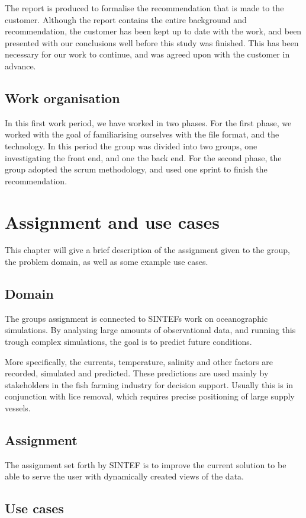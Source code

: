 \documentclass[11pt,a4paper,titlepage,oneside]{report}
\begin{document}
The report is produced to formalise the recommendation that is made to the customer. Although the report contains the entire background and recommendation, the customer has been kept up to date with the work, and been presented with our conclusions well before this study was finished. This has been necessary for our work to continue, and was agreed upon with the customer in advance.

\section{Work organisation}
In this first work period, we have worked in two phases. For the first phase, we worked with the goal of familiarising ourselves with the file format, and the technology. In this period the group was divided into two groups, one investigating the front end, and one the back end. For the second phase, the group adopted the scrum methodology, and used one sprint to finish the recommendation. 


\chapter{Assignment and use cases}
This chapter will give a brief description of the assignment given to the group, the problem domain, as well as some example use cases. 
\section{Domain}
The groups assignment is connected to SINTEFs work on oceanographic simulations. By analysing large amounts of observational data, and running this trough complex simulations, the goal is to predict future conditions. 

More specifically, the currents, temperature, salinity and other factors are recorded, simulated and predicted. These predictions are used mainly by stakeholders in the fish farming industry for decision support. Usually this is in conjunction with lice removal, which requires precise positioning of large supply vessels. 

\section{Assignment}
The assignment set forth by SINTEF is to improve the current solution to be able to serve the user with dynamically created views of the data. 
\section{Use cases}
\end{document}
